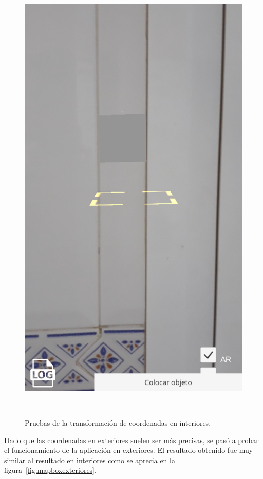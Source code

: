 \begin{figure}[H]
\begin{minipage}{0.5\textwidth}
        \includegraphics[scale=0.25]{Images/PruebasMapbox/mapboxGPS (6).png}\\
    \end{minipage}\\
    \caption{Pruebas de la transformación de coordenadas en interiores.}
    \label{fig:mapboxinteriores}
\end{figure}


Dado que las coordenadas en exteriores suelen ser más precisas, se pasó a probar el funcionamiento de la aplicación en exteriores. El resultado obtenido fue muy similar al resultado en interiores como se aprecia en la figura~\ref{fig:mapboxexteriores}.\\



